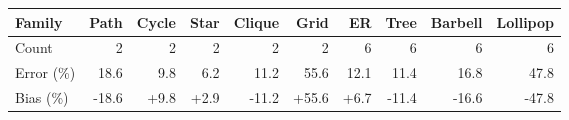 \begin{tabular}{lrrrrrrrrr}\toprule
Family & Path & Cycle & Star & Clique & Grid & ER & Tree & Barbell & Lollipop \\ \midrule
Count & 2 & 2 & 2 & 2 & 2 & 6 & 6 & 6 & 6 \\
Error (\%) & 18.6 & 9.8 & 6.2 & 11.2 & 55.6 & 12.1 & 11.4 & 16.8 & 47.8 \\
Bias (\%) & -18.6 & +9.8 & +2.9 & -11.2 & +55.6 & +6.7 & -11.4 & -16.6 & -47.8 \\ \bottomrule\end{tabular}
